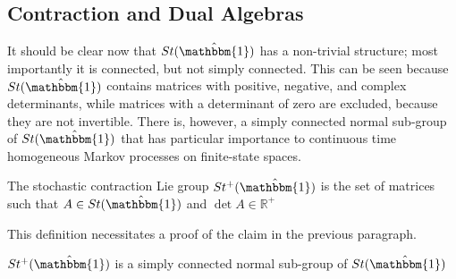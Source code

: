 \subsection{Contraction and Dual Algebras}
It should be clear now that $St(\hat{\mathbbm{1}})$ has a non-trivial structure; most
importantly it is connected, but not simply connected. This can be seen because $St(\hat{\mathbbm{1}})$
contains matrices with positive, negative, and complex determinants, while matrices with a 
determinant of zero are excluded, because they are not invertible. There is, however, a 
simply connected normal sub-group of $St(\hat{\mathbbm{1}})$ that has particular importance 
to continuous time homogeneous Markov processes on finite-state spaces.
\begin{definition}
	The stochastic contraction Lie group $St^{+}(\hat{\mathbbm{1}})$ is the set
	of matrices such that $A \in St(\hat{\mathbbm{1}})$ and $\det A \in \mathbb{R}^{+}$
\end{definition}
This definition necessitates a proof of the claim in the previous paragraph.
\begin{corollary}
	$St^{+}(\hat{\mathbbm{1}})$ is a simply connected normal sub-group of $St(\hat{\mathbbm{1}})$
\end{corollary}
